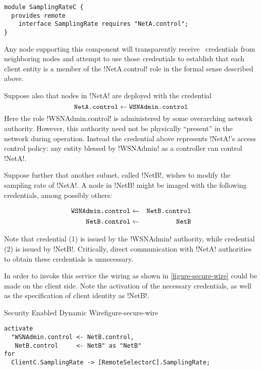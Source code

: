 \singlespace
\begin{lstlisting}
module SamplingRateC {
  provides remote
    interface SamplingRate requires "NetA.control";
}
\end{lstlisting}
\primaryspacing

Any node supporting this component will transparently receive \RT\ credentials from neighboring
nodes and attempt to use those credentials to establish that each client entity is a member of
the !NetA.control! role in the formal sense described above.

Suppose also that nodes in !NetA! are deployed with the credential
\begin{displaymath}
\texttt{NetA.control} \leftarrow \texttt{WSNAdmin.control}
\end{displaymath}
Here the role !WSNAdmin.control! is administered by some overarching network authority. However,
this authority need not be physically ``present'' in the network during operation. Instead the
credential above represents !NetA!'s access control policy: any entity blessed by !WSNAdmin! as
a controller can control !NetA!.

Suppose further that another subnet, called !NetB!, wishes to modify the sampling rate of
!NetA!. A node in !NetB! might be imaged with the following credentials, among possibly others:

\singlespace
\begin{eqnarray}
\texttt{WSNAdmin.control} & \leftarrow & \texttt{NetB.control} \\
\texttt{NetB.control}     & \leftarrow & \texttt{NetB}
\end{eqnarray}
\primaryspacing

Note that credential (1) is issued by the !WSNAdmin! authority, while credential (2) is issued
by !NetB!. Critically, direct communication with !NetA! authorities to obtain these credentials
is unnecessary.

In order to invoke this service the wiring as shown in \autoref{figure-secure-wire} could be
made on the client side. Note the activation of the necessary credentials, as well as the
specification of client identity as !NetB!.

\begin{fpfig}[t]{Security Enabled Dynamic Wire}{figure-secure-wire}
{
\singlespace
\begin{lstlisting}
activate
  "WSNAdmin.control <- NetB.control, 
   NetB.control     <- NetB" as "NetB"
for 
  ClientC.SamplingRate -> [RemoteSelectorC].SamplingRate;
\end{lstlisting}
\primaryspacing
}
\end{fpfig}

